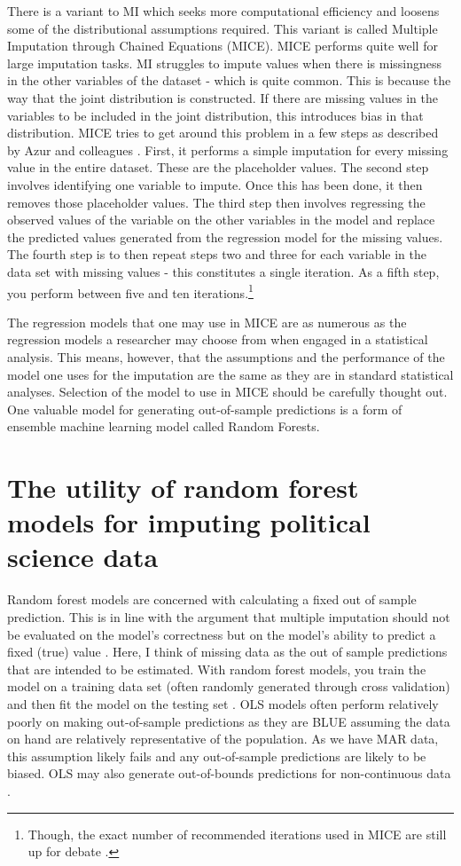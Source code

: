 \documentclass [12pt]{article}
\begin{document}
There is a variant to MI which seeks more computational efficiency and loosens some of the distributional assumptions required. This variant is called Multiple Imputation through Chained Equations (MICE). MICE performs quite well for large imputation tasks. MI struggles to impute values when there is missingness in the other variables of the dataset \citep{kropko_et-al_2014} - which is quite common. This is because the way that the joint distribution is constructed. If there are missing values in the variables to be included in the joint distribution, this introduces bias in that distribution. MICE tries to get around this problem in a few steps as described by Azur and colleagues \citep{azur_et-al_2011}. First, it performs a simple imputation for every missing value in the entire dataset. These are the placeholder values. The second step involves identifying one variable to impute. Once this has been done, it then removes those placeholder values. The third step then involves regressing the observed values of the variable on the other variables in the model and replace the predicted values generated from the regression model for the missing values. The fourth step is to then repeat steps two and three for each variable in the data set with missing values - this constitutes a single iteration. As a fifth step, you perform between five and ten iterations.\footnote{Though, the exact number of recommended iterations used in MICE are still up for debate \citep[see][]{buuren_goothuis-oudshoorn_2011, azur_et_al_2011}.} 

The regression models that one may use in MICE are as numerous as the regression models a researcher may choose from when engaged in a statistical analysis. This means, however, that the assumptions and the performance of the model one uses for the imputation are the same as they are in standard statistical analyses. Selection of the model to use in MICE should be carefully thought out. One valuable model for generating out-of-sample predictions is a form of ensemble machine learning model called Random Forests. 
\section{The utility of random forest models for imputing political science data}
Random forest models are concerned with calculating a fixed out of sample prediction. This is in line with the argument that multiple imputation  should not be evaluated on the model's correctness but on the model's ability to predict a fixed (true) value \citep{rubin_1996}. Here, I think of missing data as the out of sample predictions that are intended to be estimated. With random forest models, you train the model on a training data set (often randomly generated through cross validation) and then fit the model on the testing set \citep{hastie_et-al_2009}. OLS models often perform relatively poorly on making out-of-sample predictions as they are BLUE assuming the data on hand are relatively representative of the population. As we have MAR data, this assumption likely fails and any out-of-sample predictions are likely to be biased. OLS may also generate out-of-bounds predictions for non-continuous data \citep{long_1997,gelman_et-al_2021}. 
\end{document}

